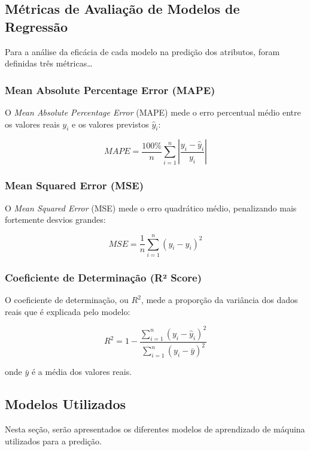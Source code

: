 \documentclass{article}
\begin{document}
\newpage


\subsection{Métricas de Avaliação de Modelos de Regressão}

Para a análise da eficácia de cada modelo na predição dos atributos, foram definidas três métricas\dots

\subsubsection{Mean Absolute Percentage Error (MAPE)}

O \textit{Mean Absolute Percentage Error} (MAPE) mede o erro percentual médio entre
os valores reais $y_i$ e os valores previstos $\hat{y}_i$:

\[
MAPE = \frac{100\%}{n} \sum_{i=1}^{n} \left| \frac{y_i - \hat{y}_i}{y_i} \right|
\]



\subsubsection{Mean Squared Error (MSE)}

O \textit{Mean Squared Error} (MSE) mede o erro quadrático médio, penalizando mais
fortemente desvios grandes:

\[
MSE = \frac{1}{n} \sum_{i=1}^{n} (y_i - \hat{y}_i)^2
\]



\subsubsection{Coeficiente de Determinação (R² Score)}

O coeficiente de determinação, ou $R^2$, mede a proporção da variância dos dados
reais que é explicada pelo modelo:

\[
R^2 = 1 - \frac{\sum_{i=1}^{n} (y_i - \hat{y}_i)^2}{\sum_{i=1}^{n} (y_i - \bar{y})^2}
\]

onde $\bar{y}$ é a média dos valores reais.


\newpage



\subsection{Modelos Utilizados}

Nesta seção, serão apresentados os diferentes modelos de aprendizado de máquina utilizados para a predição. 
\end{document}
